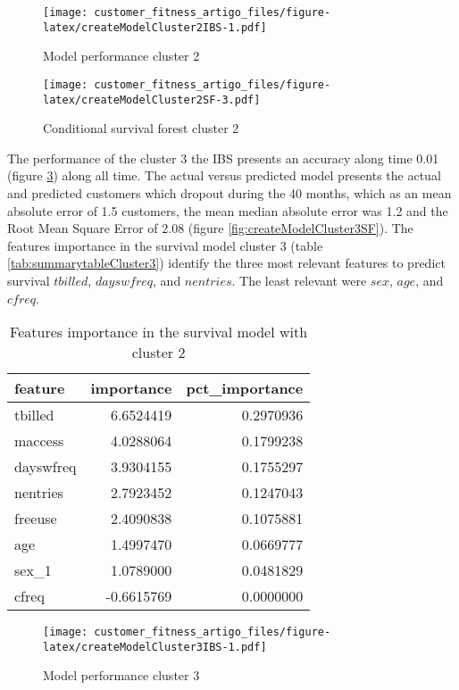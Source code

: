 \documentclass[
  12pt,
]{article}
\begin{document}
\begin{figure}
\centering
\texttt{[image: customer\_fitness\_artigo\_files/figure-latex/createModelCluster2IBS-1.pdf]}
\caption{\label{fig:createModelCluster2IBS}Model performance cluster 2}
\end{figure}

\begin{figure}
\centering
\texttt{[image: customer\_fitness\_artigo\_files/figure-latex/createModelCluster2SF-3.pdf]}
\caption{\label{fig:createModelCluster2SF}Conditional survival forest cluster 2}
\end{figure}

The performance of the cluster 3 the IBS presents an accuracy along time 0.01
(figure \ref{fig:createModelCluster3IBS}) along all time.
The actual versus predicted model presents the actual and predicted customers which dropout during
the 40 months, which as an mean absolute error of 1.5 customers, the mean median absolute
error was 1.2 and the Root Mean Square Error of 2.08 (figure \ref{fig:createModelCluster3SF}).
The features importance in the survival model cluster 3 (table \ref{tab:summarytableCluster3})
identify the three most relevant features to predict survival \(tbilled\),
\(dayswfreq\), and \(nentries\).
The least relevant were \(sex\), \(age\), and \(cfreq\).

\begin{table}

\caption{\label{tab:summarytableCluster2}Features importance in the survival model with cluster 2}
\centering
\begin{tabular}[t]{lrr}
\toprule
feature & importance & pct\_importance\\
\midrule
tbilled & 6.6524419 & 0.2970936\\
maccess & 4.0288064 & 0.1799238\\
dayswfreq & 3.9304155 & 0.1755297\\
nentries & 2.7923452 & 0.1247043\\
freeuse & 2.4090838 & 0.1075881\\
\addlinespace
age & 1.4997470 & 0.0669777\\
sex\_1 & 1.0789000 & 0.0481829\\
cfreq & -0.6615769 & 0.0000000\\
\bottomrule
\end{tabular}
\end{table}

\begin{figure}
\centering
\texttt{[image: customer\_fitness\_artigo\_files/figure-latex/createModelCluster3IBS-1.pdf]}
\caption{\label{fig:createModelCluster3IBS}Model performance cluster 3}
\end{figure}
\end{document}
